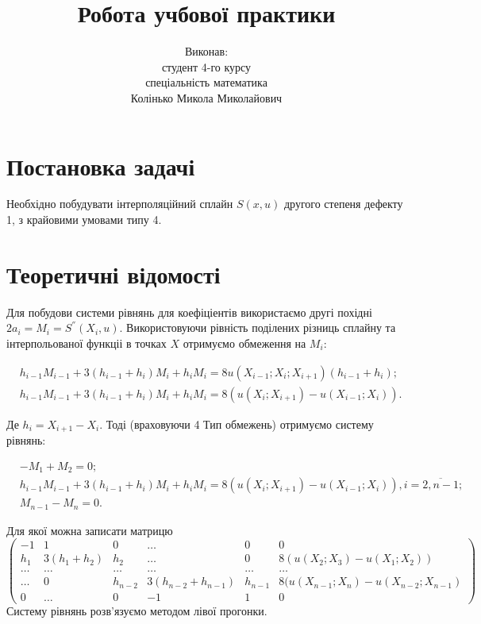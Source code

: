 \documentclass[titlepage]{article}
\begin{document}
\title{\LARGE Робота учбової практики}
\author{\vspace{12cm}Виконав: \protect\\ студент 4-го курсу \protect\\ спеціальність математика \protect\\ Колінько Микола Миколайович}
\date{}
\maketitle

\section{Постановка задачі}

Необхідно побудувати інтерполяційний сплайн $S(x, u)$ другого степеня дефекту 1, з крайовими умовами типу 4.
\section{Теоретичні відомості}

Для побудови системи рівнянь для коефіціентів використаємо другі похідні $2a_i = M_i = S^{''}(X_i, u)$. Використовуючи рівність поділених різниць сплайну та інтерпольованої функціі в точках $X$ отримуємо обмеження на $M_i$:

\begin{equation}
\begin{split}
&h_{i-1}M_{i-1} + 3(h_{i-1} + h_i)M_i + h_iM_i = 8u(X_{i-1};X_i;X_{i+1})(h_{i-1} + h_i);\\
&h_{i-1}M_{i-1} + 3(h_{i-1} + h_i)M_i + h_iM_i = 8(u(X_i; X_{i+1}) - u(X_{i-1}; X_i)).
\end{split}
\nonumber
\end{equation}

Де $h_i = X_{i+1} - X_i$. Тоді (враховуючи 4 Тип обмежень) отримуємо систему рівнянь:

\begin{equation}
\begin{split}
&-M_1 + M_2= 0;\\
&h_{i-1}M_{i-1} + 3(h_{i-1} + h_i)M_i + h_iM_i = 8(u(X_i; X_{i+1}) - u(X_{i-1}; X_i)), i = \overline{2,n-1};\\
&M_{n-1} - M_{n} = 0.
\end{split}
\nonumber
\end{equation}

Для якої можна записати матрицю
\[\left(\begin{array}{ccccc|c}
-1 & 1 & 0 & \ldots & 0 & 0\\
h_1 & 3(h_1 + h_2) & h_2 & \ldots& 0  & 8(u(X_2; X_3) - u(X_1; X_2))\\
\ldots &\ldots &\ldots &\ldots &\ldots & \ldots\\
\ldots & 0 &h_{n-2} & 3(h_{n-2} + h_{n- 1}) & h_{n-1} & 8(u(X_{n-1}; X_n) - u(X_{n-2}; X_{n-1})\\
0 & \ldots & 0  & -1 & 1 & 0
\end{array}\right)\]
Систему рівнянь розв'язуємо методом лівої прогонки.
\end{document}
